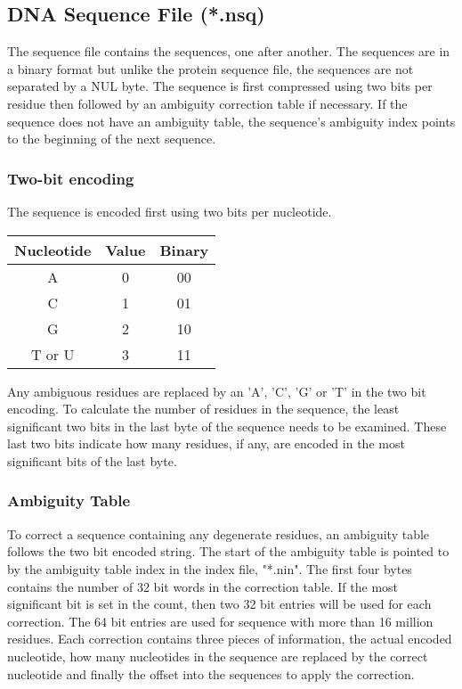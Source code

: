 \subsection{DNA Sequence File (*.nsq)}

The sequence file contains the sequences, one after another.  The 
sequences are in a binary format but unlike the protein sequence 
file, the sequences are not separated by a NUL byte.  The 
sequence is first compressed using two bits per residue then 
followed by an ambiguity correction table if 
necessary.  If the sequence does not have an ambiguity table, 
the sequence's ambiguity index points to the beginning of the 
next sequence.

\subsubsection{Two-bit encoding}

The sequence is encoded first using two bits per nucleotide.

\bigskip
\begin{center}
\begin{tabular}{|c|c|c|} \hline
Nucleotide & Value & Binary \\ \hline
A & 0 & 00 \\ \hline
C & 1 & 01 \\ \hline
G & 2 & 10 \\ \hline
T or U & 3 & 11 \\ \hline
\end{tabular}
\end{center}
\bigskip

Any 
ambiguous residues are replaced by an 'A', 'C', 'G' or 'T' in 
the two bit encoding.  To calculate the number of residues 
in the sequence, the least significant two bits in the 
last byte of the sequence needs to be examined.  
These last two bits indicate how many residues, if any, are 
encoded in the most significant bits of the last byte.


\subsubsection{Ambiguity Table}

To correct a sequence containing any degenerate residues, an 
ambiguity table follows the two bit encoded string.  
The start of the ambiguity table is 
pointed to by the ambiguity table index in the index file, 
"*.nin".  The first four bytes contains the number of 32 bit 
words in the correction table.  If the most significant bit 
is set in the count, then two 32 bit entries will be used for 
each correction.  
The 64 bit entries are used for sequence with
more than 16 million residues.  Each correction contains three 
pieces of 
information, the actual encoded nucleotide, how many nucleotides
in the sequence are replaced by the correct nucleotide and finally 
the offset into the sequences to apply the correction. 

